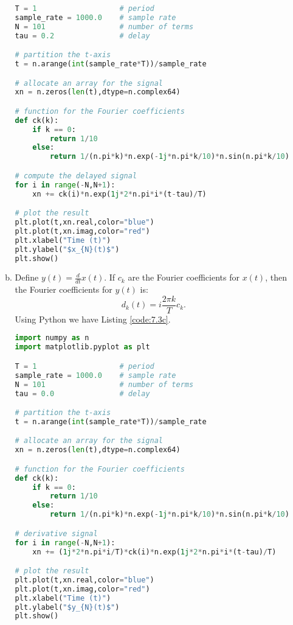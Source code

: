 \begin{enumerate}
\begin{enumerate}[a)]
\begin{lstlisting}[language=Python, caption=Suggested solution to b),label=code:7.3b]
T = 1                   # period
sample_rate = 1000.0    # sample rate
N = 101                 # number of terms 
tau = 0.2               # delay

# partition the t-axis
t = n.arange(int(sample_rate*T))/sample_rate

# allocate an array for the signal
xn = n.zeros(len(t),dtype=n.complex64)

# function for the Fourier coefficients
def ck(k):
    if k == 0:
        return 1/10
    else:
        return 1/(n.pi*k)*n.exp(-1j*n.pi*k/10)*n.sin(n.pi*k/10)

# compute the delayed signal
for i in range(-N,N+1):
    xn += ck(i)*n.exp(1j*2*n.pi*i*(t-tau)/T)

# plot the result
plt.plot(t,xn.real,color="blue")
plt.plot(t,xn.imag,color="red")
plt.xlabel("Time (t)")
plt.ylabel("$x_{N}(t)$")
plt.show()
\end{lstlisting}

\item Define $y(t)=\frac{d}{dt}x(t)$. If $c_{k}$ are the Fourier coefficients for $x(t)$, then the Fourier coefficients for $y(t)$ is:
$$d_{k}(t)=i \frac{2\pi k}{T}c_{k}.$$
Using Python we have Listing \ref{code:7.3c}.
\begin{lstlisting}[language=Python, caption=Suggested solution to c),label=code:7.3c]
import numpy as n
import matplotlib.pyplot as plt

T = 1                   # period
sample_rate = 1000.0    # sample rate
N = 101                 # number of terms 
tau = 0.0               # delay

# partition the t-axis
t = n.arange(int(sample_rate*T))/sample_rate

# allocate an array for the signal
xn = n.zeros(len(t),dtype=n.complex64)

# function for the Fourier coefficients
def ck(k):
    if k == 0:
        return 1/10
    else:
        return 1/(n.pi*k)*n.exp(-1j*n.pi*k/10)*n.sin(n.pi*k/10)

# derivative signal
for i in range(-N,N+1):
    xn += (1j*2*n.pi*i/T)*ck(i)*n.exp(1j*2*n.pi*i*(t-tau)/T)

# plot the result
plt.plot(t,xn.real,color="blue")
plt.plot(t,xn.imag,color="red")
plt.xlabel("Time (t)")
plt.ylabel("$y_{N}(t)$")
plt.show()
\end{lstlisting}
\end{enumerate}


\end{enumerate}